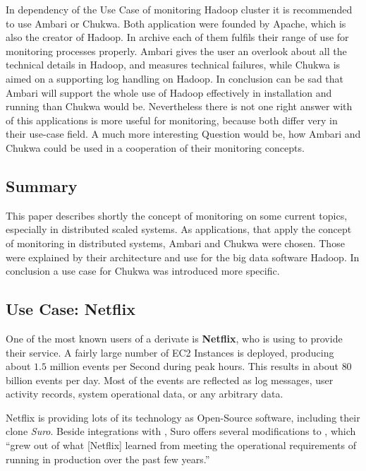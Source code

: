 In dependency of the Use Case of monitoring Hadoop cluster it is recommended to use Ambari or Chukwa. 
Both application were founded by Apache, which is also the creator of Hadoop. 
In archive each of them fulfils their range of use for monitoring processes properly. 
Ambari gives the user an overlook about all the technical details in Hadoop, and measures technical failures, while Chukwa is aimed on a supporting log handling on Hadoop. 
In conclusion can be sad that Ambari will support the whole use of Hadoop effectively in installation and running than Chukwa would be. 
Nevertheless there is not one right answer with of this applications is more useful for monitoring, because both differ very in their use-case field. 
A much more interesting Question would be, how Ambari and Chukwa could be used in a cooperation of their monitoring concepts.


\subsection{Summary}
This paper describes shortly the concept of monitoring on some current topics, especially in distributed scaled systems. As applications, that apply the concept of monitoring in distributed systems, Ambari and Chukwa were chosen. Those were explained by their architecture and use for the big data software Hadoop. In conclusion a use case for Chukwa was introduced more specific. 

\subsection{Use Case: Netflix}
\label{netflix}
One of the most known users of a \chuk derivate is \textbf{Netflix}, who is using \aws to provide their service. 
A fairly large number of \aws EC2 Instances is deployed, producing about $1.5$ million events per Second during peak hours. 
This results in about $80$ billion events per day. 
Most of the events are reflected as log messages, user activity records, system operational data, or any arbitrary data.~\cite{Bae2013}

Netflix is providing lots of its technology as Open-Source software, including their \chuk clone \textit{Suro}. 
Beside integrations with \noss, Suro offers several modifications to \chuk, which ``grew out of what [Netflix] learned from meeting the operational requirements of running in production over the past few years.''~\cite{Bae2013}

